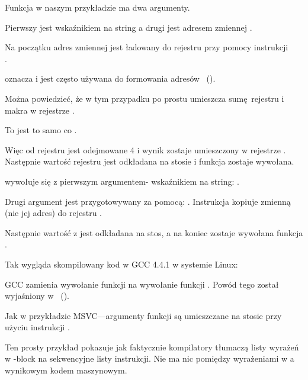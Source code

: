 Funkcja \scanf w naszym przykładzie ma dwa argumenty.

Pierwszy jest wskaźnikiem na string  a drugi jest adresem zmiennej .

Na początku adres zmiennej  jest ładowany do rejestru \EAX przy pomocy instrukcji \\
.

\LEA oznacza  i jest często używana do formowania adresów ~().

Można powiedzieć, że w tym przypadku \LEA po prostu umieszcza sumę rejestru \EBP i makra  w rejestrze \EAX.

To jest to samo co .

Więc od rejestru \EBP jest odejmowane 4 i wynik zostaje umieszczony w rejestrze \EAX.
Następnie wartość rejestru \EAX jest odkładana na stosie i funkcja \scanf zostaje wywołana.

\printf wywołuje się z pierwszym argumentem- wskaźnikiem na string:
.

Drugi argument jest przygotowywany za pomocą: .
Instrukcja kopiuje zmienną  (nie jej adres) do rejestru \ECX.

Następnie wartość z \ECX jest odkładana na stos, a na koniec zostaje wywołana funkcja  \printf.




Tak wygląda skompilowany kod w GCC 4.4.1 w systemie Linux:



GCC zamienia wywołanie funkcji \printf na wywołanie funkcji \puts. Powód tego został wyjaśniony w ~().

% 

Jak w przykładzie MSVC---argumenty funkcji są umieszczane na stosie przy użyciu instrukcji \MOV.


Ten prosty przykład pokazuje jak faktycznie kompilatory tłumaczą
listy wyrażeń w \CCpp-block na sekwencyjne listy instrukcji.
Nie ma nic pomiędzy wyrażeniami w \CCpp a wynikowym kodem maszynowym.
